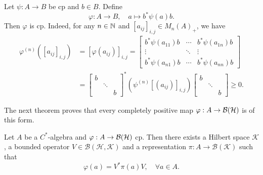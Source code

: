 \begin{example}
    Let $\psi: A \to B$ be cp and $b \in B$.
    Define $$\varphi :A \to B ,\quad a \mapsto b^* \psi(a) b.$$
    Then $\varphi$ is cp. Indeed, for any $n \in \mathbb {N}$ and $[a_{ij}]_{i, j} \in M_n (A)_+$,
    we have 
    \begin{align*}
        \varphi^{(n)} ([a_{ij}]_{i, j}) &= [\varphi(a_{ij})]_{i, j} = \begin{bmatrix}
            b^* \psi (a_{11})  b & \cdots & b^* \psi (a_{1n}) b\\
            \vdots & \ddots & \vdots\\
            b^* \psi (a_{n1})  b & \cdots & b^* \psi (a_{nn}) b
        \end{bmatrix}\\
        &= \begin{bmatrix}
            b & & \\
             & \ddots & \\
              & & b
        \end{bmatrix}^* (\psi^{(n)} [(a_{ij})]_{i, j}) \begin{bmatrix}
            b & & \\
              & \ddots & \\
              & & b
        \end{bmatrix} \geq 0.
    \end{align*}
\end{example}

The next theorem proves that every completely positive map $\varphi : A \to \operatorname{\mathcal{B} (\mathcal{H})}$
is of this form.

\begin{theorem}[Stinespring]
    Let $A$ be a $C^*$-algebra and $\varphi: A \to \operatorname{\mathcal{B} (\mathcal{H})}$ cp.
    Then there exists a Hilbert space $\mathcal{K}$, a bounded operator $V \in \mathcal{B} (\mathcal{H}, \mathcal{K})$
    and a representation 
    $\pi: A \to \mathcal{B} (\mathcal{K})$ such that 
    $$\varphi(a) = V^* \pi(a) V,\quad \forall a \in A.$$
\end{theorem}

